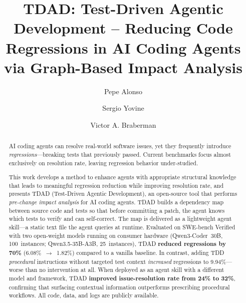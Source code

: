 \documentclass[sigconf,nonacm]{acmart}
\begin{document}
\title{TDAD: Test-Driven Agentic Development -- Reducing Code Regressions
  in AI Coding Agents via Graph-Based Impact Analysis}

\author{Pepe Alonso}

\author{Sergio Yovine}

\author{Victor A. Braberman}

\begin{abstract}
AI coding agents can resolve real-world software issues, yet they frequently
introduce \emph{regressions}---breaking tests that previously passed.
Current benchmarks focus almost exclusively on resolution rate, leaving
regression behavior under-studied.

This work develops a method to enhance agents with appropriate structural
knowledge that leads to meaningful regression reduction while improving
resolution rate, and presents \textsc{TDAD} (Test-Driven Agentic
Development), an open-source tool that performs \emph{pre-change impact
analysis} for AI coding agents.  \textsc{TDAD} builds a dependency map between source code
and tests so that before committing a patch, the agent knows which tests
to verify and can self-correct.  The map is delivered as a lightweight
agent skill---a static text file the agent queries at runtime.
Evaluated on SWE-bench Verified with two open-weight models running on
consumer hardware (Qwen3-Coder~30B, 100~instances; Qwen3.5-35B-A3B,
25~instances), \textsc{TDAD} \textbf{reduced regressions by 70\%}
(6.08\%~$\to$~1.82\%) compared to a vanilla baseline.  In contrast,
adding TDD \emph{procedural} instructions without targeted test context
\emph{increased} regressions to 9.94\%---worse than no intervention at
all.  When deployed as an agent skill with a different model and framework,
\textsc{TDAD} \textbf{improved issue-resolution rate from 24\% to 32\%},
confirming that surfacing contextual information outperforms prescribing
procedural workflows.
All code, data, and logs are publicly available.
\end{abstract}


\maketitle
\end{document}
